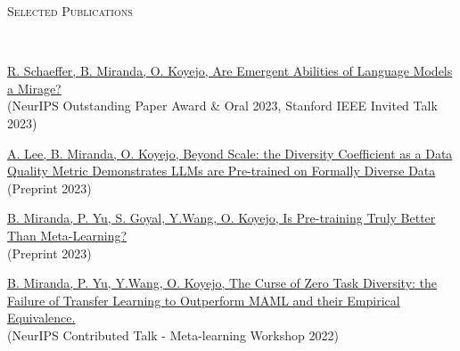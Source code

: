 \documentclass{article}
\newenvironment{changemargin}[2]{%
  \begin{list}{}{%
    \setlength{\topsep}{0pt}%
    \setlength{\leftmargin}{#1}%
    \setlength{\rightmargin}{#2}%
    \setlength{\listparindent}{\parindent}%
    \setlength{\itemindent}{\parindent}%
    \setlength{\parsep}{\parskip}%
  }%
  \item[]}{\end{list}
}
\newcommand{\lineover}{
	\begin{changemargin}{-0.05in}{-0.05in}
		\vspace*{-8pt}
		\hrulefill \\
		\vspace*{-2pt}
	\end{changemargin}
}
\newcommand{\header}[1]{
	\begin{changemargin}{-0.5in}{-0.5in}
		\scshape{#1}\\
  	\lineover
	\end{changemargin}
}
\newenvironment{body} {
	\vspace*{-16pt}
	\begin{changemargin}{-0.25in}{-0.5in}
  }	
	{\end{changemargin}
}
\begin{document}
\header{Selected Publications}
\begin{body}
    \vspace{4pt} %
    
    \vspace{10pt}
    \href{https://arxiv.org/abs/2304.15004}
    {R. Schaeffer, B. Miranda, O. Koyejo, 
    Are Emergent Abilities of Language Models a Mirage?}
    \\
    (NeurIPS Outstanding Paper Award \& Oral 2023, Stanford IEEE Invited Talk 2023)


    \vspace{10pt}
    \href{https://arxiv.org/abs/2306.13840}
    {A. Lee, B. Miranda, O. Koyejo,
    Beyond Scale: the Diversity Coefficient as a Data Quality Metric Demonstrates LLMs are Pre-trained on Formally Diverse Data}
    \\
    (Preprint 2023)

    \vspace{10pt}
    \href{https://arxiv.org/abs/2306.13841}
    {B. Miranda, P. Yu, S. Goyal, Y.Wang, O. Koyejo,
    Is Pre-training Truly Better Than Meta-Learning?}
    \\
    (Preprint 2023)
    
    \vspace{10pt}
    \href{https://arxiv.org/abs/2208.01545}{B. Miranda, P. Yu, Y.Wang, O. Koyejo,
    The Curse of Zero Task Diversity: the Failure of Transfer Learning to Outperform MAML and their Empirical Equivalence.}
    \\
    (NeurIPS Contributed Talk - Meta-learning Workshop 2022)

    

\end{body}
\end{document}
